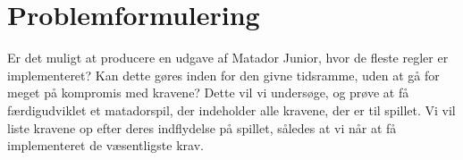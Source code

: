 \chapter{Problemformulering}
Er det muligt at producere en udgave af Matador Junior, hvor de fleste regler er implementeret? Kan dette gøres inden for den givne tidsramme, uden at gå for meget på kompromis med kravene? Dette vil vi undersøge, og prøve at få færdigudviklet et matadorspil, der indeholder alle kravene, der er til spillet. Vi vil liste kravene op efter deres indflydelse på spillet, således at vi når at få implementeret de væsentligste krav.
